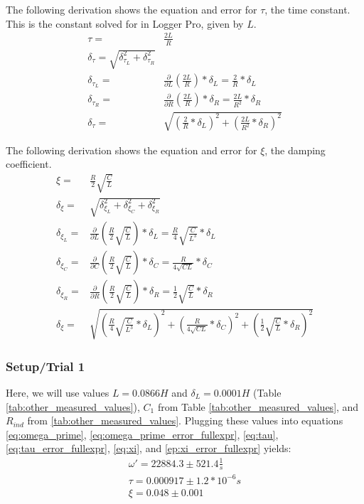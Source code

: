 \documentclass[12pt]{article}
\newcommand{\paren}[1]{\left( {#1} \right)}
\begin{document}
The following derivation shows the equation and error for $\tau$, the time constant. This is the constant solved for in Logger Pro, given by $L$.
\begin{align}
	\tau=&\frac{2L}{R} \label{eq:tau} \\
	\delta_{\tau}=\sqrt{\delta_{\tau_L}^2+\delta_{\tau_R}^2} \label{eq:tau_error} \\
	\delta_{\tau_L}=&\frac{\partial}{\partial L}\paren{\frac{2L}{R}}*\delta_L = \frac{2}{R}*\delta_L \nonumber \\
	\delta_{\tau_R}=&\frac{\partial}{\partial R}\paren{\frac{2L}{R}}*\delta_R = \frac{2L}{R^2}*\delta_R \nonumber \\
	\delta_{\tau}=& \sqrt{\paren{\frac{2}{R}*\delta_L}^2+\paren{\frac{2L}{R^2}*\delta_R}^2} \label{eq:tau_error_fullexpr}
\end{align}

The following derivation shows the equation and error for $\xi$, the damping coefficient.
\begin{align}
	\xi=&\frac{R}{2}\sqrt{\frac{C}{L}} \label{eq:xi}\\
	\delta_{\xi}=&\sqrt{\delta_{\xi_{L}}^2+\delta_{\xi_{C}}^2+\delta_{\xi_{R}}^2} \label{eq:xi_error} \\
	\delta_{\xi_{L}}=&\frac{\partial}{\partial L}\paren{\frac{R}{2}\sqrt{\frac{C}{L}}}*\delta_L = \frac{R}{4}\sqrt{\frac{C}{L^3}}*\delta_L \nonumber \\
	\delta_{\xi_{C}}=&\frac{\partial}{\partial C}\paren{\frac{R}{2}\sqrt{\frac{C}{L}}}*\delta_C = \frac{R}{4\sqrt{CL}}*\delta_C \nonumber \\
	\delta_{\xi_{R}}=&\frac{\partial}{\partial R}\paren{\frac{R}{2}\sqrt{\frac{C}{L}}}*\delta_R = \frac{1}{2}\sqrt{\frac{C}{L}}*\delta_R \nonumber \\
	\delta_{\xi}=&\sqrt{\paren{\frac{R}{4}\sqrt{\frac{C}{L^3}}*\delta_L}^2+\paren{\frac{R}{4\sqrt{CL}}*\delta_C}^2+\paren{\frac{1}{2}\sqrt{\frac{C}{L}}*\delta_R}^2} \label{ep:xi_error_fullexpr}
\end{align}

\subsubsection{Setup/Trial 1}
Here, we will use values $L=0.0866H$ and $\delta_L=0.0001H$ (Table \ref{tab:other_measured_values}), $C_1$ from Table \ref{tab:other_measured_values}, and $R_{ind}$ from \ref{tab:other_measured_values}. Plugging these values into equations \ref{eq:omega_prime}, \ref{eq:omega_prime_error_fullexpr}, \ref{eq:tau}, \ref{eq:tau_error_fullexpr}, \ref{eq:xi}, and \ref{ep:xi_error_fullexpr} yields:
\begin{align}
	\omega'=22884.3\pm521.4\frac{1}{s} \label{num:omega_prime_trial_one} \\
	\tau=0.000917\pm1.2*10^{-6} s \label{num:tau_trial_one} \\
	\xi=0.048\pm0.001 \label{num:xi_trial_one}
\end{align}
\end{document}
